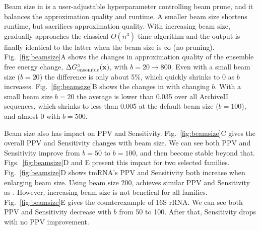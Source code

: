 Beam size in \linearpartition is a user-adjustable hyperparameter controlling beam prune, 
and it balances the approximation quality and runtime.
A smaller beam size shortens runtime, but sacrifices approximation quality.
With increasing beam size, \linearpartition gradually approaches the classical $O(n^3)$-time algorithm and 
the output is finally identical to the latter when the beam size is $\infty$ (no pruning).
Fig.~\ref{fig:beamsize}A shows the changes in approximation quality of the ensemble free energy change,
$\Delta G^\circ_\text{ensemble}(\mathbf{x})$, with $b=20\rightarrow 800$.
Even with a small beam size ($b=20$) the difference is only about 5\%, which quickly shrinks to 0 as $b$ increases.
Fig.~\ref{fig:beamsize}B shows the changes in \RMSD with changing $b$. %
With a small beam size $b=20$ the average \RMSD is lower than 0.035
over all ArchiveII sequences,
which shrinks to less than 0.005 at the default beam size ($b=100$),
and almost 0 with $b=500$.%


Beam size also has impact on PPV and Sensitivity.
Fig.~\ref{fig:beamsize}C gives the overall PPV and Sensitivity changes with beam size.
We can see both PPV and Sensitivity improve from $b=50$ to $b=100$,
and then become stable beyond that.
Figs.~\ref{fig:beamsize}D and E present this impact for two selected families.
Fig.~\ref{fig:beamsize}D shows tmRNA's PPV and Sensitivity both increase when enlarging beam size.
Using beam size 200, \linearpartition achieves similar PPV and Sensitivity as \rnafold.
However, increasing beam size is not benefical for all families.
Fig.~\ref{fig:beamsize}E gives the counterexample of 16S rRNA. 
We can see both PPV and Sensitivity decrease with $b$ from 50 to 100.
After that, Sensitivity drops with no PPV improvement.

